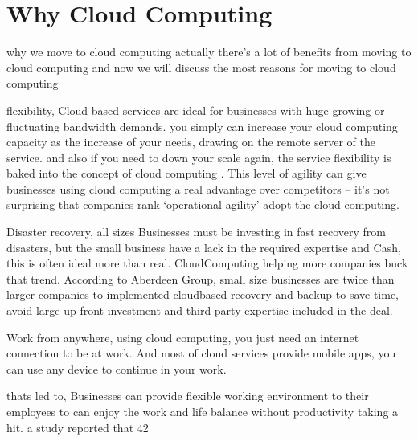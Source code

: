 \documentclass [12pt]{book}
\begin{document}
	

	\chapter{Why Cloud Computing }
	
	why we move to cloud computing actually there's a lot of benefits from moving to cloud computing and now we will discuss the most reasons for moving to cloud computing 
	 \newline
	 \newline
	 \newline
	
	
	flexibility, Cloud-based services are ideal for businesses with huge growing or fluctuating bandwidth demands. you simply can increase your cloud computing capacity as the increase of your needs, drawing on the remote server of the service. and also if you need to down your scale again, the service flexibility is baked into the concept of cloud computing . This level of agility can give businesses using cloud computing a real advantage over competitors – it’s not surprising that companies rank ‘operational agility’ adopt the cloud computing.
	\newline
	\newline
	\newline
	
	Disaster recovery,  all sizes Businesses  must be investing in fast recovery from  disasters, but the small business have a lack in the required  expertise and Cash, this is often  ideal more than real. CloudComputing helping more companies buck that trend. According to Aberdeen Group, small size businesses are twice than larger companies to  implemented cloudbased recovery and backup to save time, avoid large up-front investment and  third-party expertise included in the deal.
	\newline
	\newline
	\newline
	
	Work from anywhere, using cloud computing, you just need an internet connection to be at work. And most of  cloud services provide mobile apps, you can use any device to continue in your work.
	
	thats led to, Businesses can provide flexible working environment to their employees to can enjoy the work and life balance without productivity taking a hit. a study reported that 42%
	\newline
	\newline
	\newline
	
\end{document}
